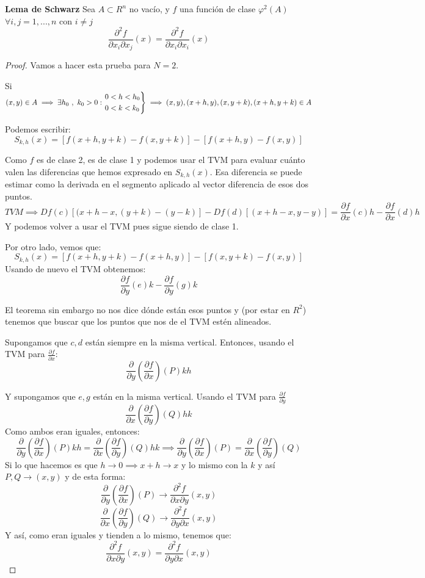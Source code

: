 \textbf{Lema de Schwarz}
Sea $A\subset R^n$ no vacío, y $f$ una función de clase $\varphi^2(A)$
$\forall i,j = 1,...,n$ con $i\ne j$
\[
\frac{\partial^2f}{\partial x_i \partial x_j}(x) = \frac{\partial^2 f}{\partial x_i \partial x_i}(x)
\]
\begin{proof}

Vamos a hacer esta prueba para $N=2$.

Si $(x,y) \in A \implies \exists h_0 \ , \ k_0 > 0 : \begin{rcases}
	0 < h < h_0 \\
	0 < k < k_0
\end{rcases} \implies (x,y),(x+h,y),(x,y+k),(x+h,y+k) \in A$

Podemos escribir:
\[
S_{k,h}(x) =[f(x+h,y+k) - f(x,y+k)] - [f(x+h,y) -f(x,y)]
\]

Como $f$ es de clase 2, es de clase 1 y podemos usar el TVM para evaluar cuánto valen las diferencias que hemos expresado en $S_{k,h}(x)$. Esa diferencia se puede estimar como la derivada en el segmento aplicado al vector diferencia de esos dos puntos.
\[
TVM \implies Df(c)[(x+h-x,(y+k)-(y-k)] -Df(d)[(x+h-x,y-y)]= \frac{\partial f}{\partial x}(c)h - \frac{\partial f}{\partial x}(d)h
\]
Y podemos volver a usar el TVM pues sigue siendo de clase 1.

Por otro lado, vemos que:
\[
S_{k,h}(x)= [f(x+h,y+k)-f(x+h,y)]-[f(x,y+k)-f(x,y)]
\]
Usando de nuevo el TVM obtenemos:
\[
\frac{\partial f}{\partial y}(e)k - \frac{\partial f}{\partial y}(g)k
\]

El teorema sin embargo no nos dice dónde están esos puntos y (por estar en $R^2$) tenemos que buscar que los puntos que nos de el TVM estén alineados.

Supongamos que $c , d$ están siempre en la misma vertical. Entonces, usando el TVM para $\frac{\partial f}{\partial x}$:
\[
\frac{\partial}{\partial y}(\frac{\partial f}{\partial x})(P)kh
\]

Y supongamos que $e,g$ están en la misma vertical. Usando el TVM para $\frac{\partial f}{\partial y}$
\[
\frac{\partial }{\partial x}(\frac{\partial f}{\partial y})(Q)hk
\]
Como ambos eran iguales, entonces:
\[
\frac{\partial}{\partial y}(\frac{\partial f}{\partial x})(P)kh = \frac{\partial }{\partial x}(\frac{\partial f}{\partial y})(Q)hk \implies \frac{\partial}{\partial y}(\frac{\partial f}{\partial x})(P)=\frac{\partial }{\partial x}(\frac{\partial f}{\partial y})(Q)
\]
Si lo que hacemos es que $h \to 0 \implies x+h\to x$ y lo mismo con la $k$ y así $P,Q\to (x,y)$ y de esta forma:
\[
\frac{\partial}{\partial y}(\frac{\partial f}{\partial x})(P) \to \frac{\partial^2 f}{\partial x \partial y}(x,y)
\]
\[
\frac{\partial}{\partial x}(\frac{\partial f}{\partial y})(Q) \to \frac{\partial^2 f}{\partial y \partial x}(x,y)
\]
Y así, como eran iguales y tienden a lo mismo, tenemos que:
\[
\frac{\partial^2 f}{\partial x \partial y}(x,y) =  \frac{\partial^2 f}{\partial y \partial x}(x,y)
\]


\end{proof}
